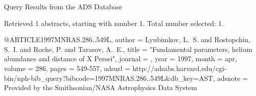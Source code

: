 Query Results from the ADS Database


Retrieved 1 abstracts, starting with number 1.  Total number selected: 1.

@ARTICLE{1997MNRAS.286..549L,
   author = {{Lyubimkov}, L.~S. and {Rostopchin}, S.~I. and {Roche}, P. and 
	{Tarasov}, A.~E.},
    title = "{Fundamental parameters, helium abundance and distance of X Persei}",
  journal = {\mnras},
     year = 1997,
    month = apr,
   volume = 286,
    pages = {549-557},
   adsurl = {http://adsabs.harvard.edu/cgi-bin/nph-bib_query?bibcode=1997MNRAS.286..549L&db_key=AST},
  adsnote = {Provided by the Smithsonian/NASA Astrophysics Data System}
}


